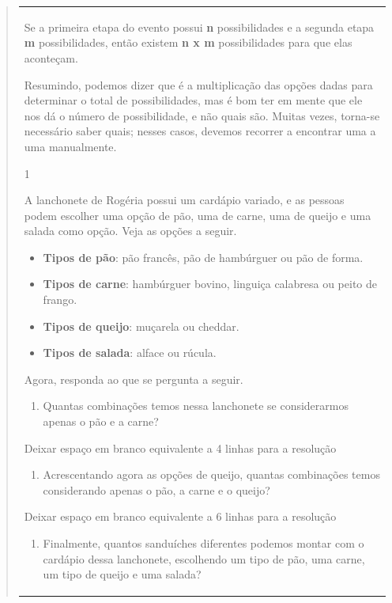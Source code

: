 \begin{mdframed}[linewidth=2pt,linecolor=salmao,roundcorner=2pt]
\begin{itemize}
{\begin{itemize}
\begin{escolha}
{\begin{quote}
{\begin{escolha}
{{{{{\begin{longtable}[]{@{}l@{}}
\begin{itemize}
{Se a primeira etapa do evento possui \textbf{n} possibilidades e a
segunda etapa \textbf{m} possibilidades, então existem \textbf{n x m}
possibilidades para que elas aconteçam.

Resumindo, podemos dizer que é a multiplicação das opções dadas para
determinar o total de possibilidades, mas é bom ter em mente que ele nos dá o número de possibilidade, e não
quais são. Muitas vezes, torna-se necessário saber quais; nesses casos, devemos
recorrer a encontrar uma a uma manualmente.

{Atividades}

\num{1}

A lanchonete de Rogéria possui um cardápio variado, e as pessoas podem
escolher uma opção de pão, uma de carne, uma de queijo e uma salada como opção.
Veja as opções a seguir.

\begin{itemize}
  \item \textbf{Tipos de pão}: pão francês, pão de hambúrguer ou pão de forma.
  \item \textbf{Tipos de carne}: hambúrguer bovino, linguiça calabresa ou peito de frango.
  \item \textbf{Tipos de queijo}: muçarela ou cheddar.
  \item \textbf{Tipos de salada}: alface ou rúcula.
\end{itemize}

Agora, responda ao que se pergunta a seguir.

\begin{enumerate}
\item
  Quantas combinações temos nessa lanchonete se considerarmos apenas o
  pão e a carne?
\end{enumerate}

Deixar espaço em branco equivalente a 4 linhas para a resolução

\begin{enumerate}
\item
  Acrescentando agora as opções de queijo, quantas combinações temos
  considerando apenas o pão, a carne e o queijo?
\end{enumerate}

Deixar espaço em branco equivalente a 6 linhas para a resolução

\begin{enumerate}
\item
  Finalmente, quantos sanduíches diferentes podemos montar com o
  cardápio dessa lanchonete, escolhendo um tipo de pão, uma carne, um tipo de queijo e uma
  salada?
\end{enumerate}

}
\end{itemize}
\end{longtable}}}}}}
\end{escolha}}
\end{quote}}
\end{escolha}
\end{itemize}}
\end{itemize}
\end{mdframed}
